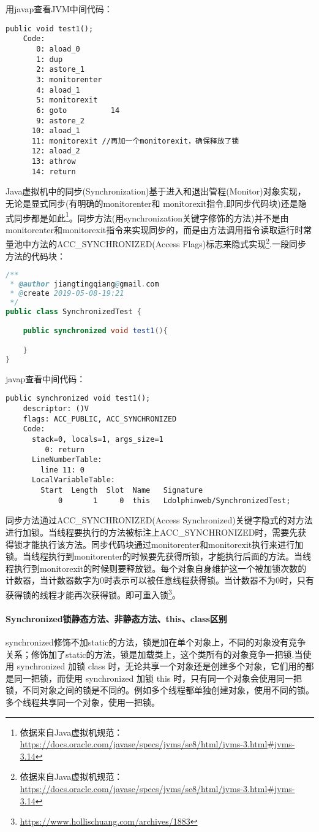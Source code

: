 \documentclass[../../../interview-questions.tex]{subfiles}
\begin{document}
用javap查看JVM中间代码：

\begin{lstlisting}
public void test1();
    Code:
       0: aload_0
       1: dup
       2: astore_1
       3: monitorenter
       4: aload_1
       5: monitorexit
       6: goto          14
       9: astore_2
      10: aload_1
      11: monitorexit //再加一个monitorexit，确保释放了锁
      12: aload_2
      13: athrow
      14: return
\end{lstlisting}

Java虚拟机中的同步(Synchronization)基于进入和退出管程(Monitor)对象实现，无论是显式同步(有明确的monitorenter和 monitorexit指令,即同步代码块)还是隐式同步都是如此\footnote{依据来自Java虚拟机规范：\url{https://docs.oracle.com/javase/specs/jvms/se8/html/jvms-3.html\#jvms-3.14}}。同步方法(用synchronization关键字修饰的方法)并不是由monitorenter和monitorexit指令来实现同步的，而是由方法调用指令读取运行时常量池中方法的ACC\_SYNCHRONIZED(Access Flags)标志来隐式实现\footnote{依据来自Java虚拟机规范：\url{https://docs.oracle.com/javase/specs/jvms/se8/html/jvms-3.html\#jvms-3.14}}.一段同步方法的代码块：

\begin{lstlisting}[language=Java]
/**
 * @author jiangtingqiang@gmail.com
 * @create 2019-05-08-19:21
 */
public class SynchronizedTest {

    public synchronized void test1(){

    }
}
\end{lstlisting}

javap查看中间代码：

\begin{lstlisting}
public synchronized void test1();
    descriptor: ()V
    flags: ACC_PUBLIC, ACC_SYNCHRONIZED
    Code:
      stack=0, locals=1, args_size=1
         0: return
      LineNumberTable:
        line 11: 0
      LocalVariableTable:
        Start  Length  Slot  Name   Signature
            0       1     0  this   Ldolphinweb/SynchronizedTest;
\end{lstlisting}

同步方法通过ACC\_SYNCHRONIZED(Access Synchronized)关键字隐式的对方法进行加锁。当线程要执行的方法被标注上ACC\_SYNCHRONIZED时，需要先获得锁才能执行该方法。同步代码块通过monitorenter和monitorexit执行来进行加锁。当线程执行到monitorenter的时候要先获得所锁，才能执行后面的方法。当线程执行到monitorexit的时候则要释放锁。每个对象自身维护这一个被加锁次数的计数器，当计数器数字为0时表示可以被任意线程获得锁。当计数器不为0时，只有获得锁的线程才能再次获得锁。即可重入锁\footnote{\url{https://www.hollischuang.com/archives/1883}}。

\paragraph{Synchronized锁静态方法、非静态方法、this、class区别}

synchronized修饰不加static的方法，锁是加在单个对象上，不同的对象没有竞争关系；修饰加了static的方法，锁是加载类上，这个类所有的对象竞争一把锁.当使用 synchronized 加锁 class 时，无论共享一个对象还是创建多个对象，它们用的都是同一把锁，而使用 synchronized 加锁 this 时，只有同一个对象会使用同一把锁，不同对象之间的锁是不同的。例如多个线程都单独创建对象，使用不同的锁。多个线程共享同一个对象，使用一把锁。
\end{document}
